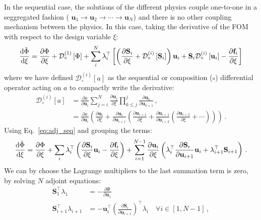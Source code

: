 In the sequential case, the solutions of the different physics couple one-to-one in a seggregated fashion (
$\mathbf{u}_1 \to \mathbf{u}_2 \to \cdots \to \mathbf{u}_N$)
and there is no other coupling mechanism between the physics. In this case, taking the derivative of the FOM with respect to the design variable $\xi$:
\begin{equation}\label{eq:adj_seq}
    \frac{\mathop{}\!\text{d} \tilde{\Phi}}{\mathop{}\!\text{d} \xi} = \frac{\partial \Phi}{\partial \xi} + \mathcal{D}^{(1)}_\circ \left[\Phi\right] + 
    \sum^N_i \lambda_{i}^{\top} \left[ \left(\frac{\partial \mathbf{S}_i}{\partial \xi} +  \mathcal{D}^{(i)}_\circ \left[\mathbf{S}_i\right]\right) \mathbf{u}_i
    + \mathbf{S}_i \mathcal{D}^{(i)}_\circ \left[\mathbf{u}_i\right] - \frac{\partial \mathbf{f}_i}{\partial \xi }\right]
\end{equation}
where we have defined $\mathcal{D}^{(i)}_\circ[a]$ as the sequential or composition ($\circ$) differential operator acting on $a$ to compactly write the derivative:
\begin{align}
    \mathcal{D}^{(i)}_\circ[a] &= \frac{\partial a}{\partial \mathbf{u}_i} \sum_{j=i}^{N} \frac{\partial \mathbf{u}_j}{\partial \xi} 
        \prod_{k \leq j}^{j} \frac{\partial \mathbf{u}_k}{\partial \mathbf{u}_{k+1}}\,, \\
        &= \frac{\partial a}{\partial \mathbf{u}_i} \left( \frac{\partial \mathbf{u}_i}{\partial \xi} + 
            \frac{\partial \mathbf{u}_i}{\partial \mathbf{u}_{i+1}} \left( \frac{\partial \mathbf{u}_{i+1}}{\partial \xi} + 
                \frac{\partial \mathbf{u}_{i+1}}{\partial \mathbf{u}_{i+2}} \left( \frac{\partial \mathbf{u}_{i+2}}{\partial \xi} + 
                    \cdots
                \right)
            \right)
        \right) \,.
    \end{align}
Using Eq.~\eqref{eq:adj_seq} and grouping the terms:
\begin{equation}
    \frac{\mathop{}\!\text{d} \tilde{\Phi}}{\mathop{}\!\text{d} \xi} =  \frac{\partial \Phi}{\partial \xi} + \sum_i \lambda_{i}^{\top} \left( \frac{\partial \mathbf{S}_i}{\partial \xi} \mathbf{u}_i - \frac{\partial \mathbf{f}_i}{\partial \xi} \right)
    + \sum^{N-1}_{i=1}  \frac{\partial \mathbf{u}_{i}}{\partial \xi} \left( \lambda_{i}^{\top} \frac{\partial \mathbf{S}_i}{\partial \mathbf{u}_{i+1}}\mathbf{u}_{i}
    +  \lambda_{i+1}^{\top} \mathbf{S}_{i+1}\right)\,.
\end{equation}
We can by choose the Lagrange multipliers to the last summation term is zero, by solving $N$ adjoint equations:
\begin{align}
    \mathbf{S}^\top_{1}\lambda_{1} &= - \frac{\partial \Phi}{\partial \mathbf{u}_{1}} \label{eq:seq_adj_1}\,\\
    \mathbf{S}^\top_{i+1}\lambda_{i+1} &= - \mathbf{u}^\top_i \left(\frac{\partial \mathbf{S}_i}{\partial \mathbf{u}_{i+1}}\right)^\top \lambda_i \quad \forall i \in [1, N-1] \label{eq:seq_adj_N-1}\,,
\end{align}
